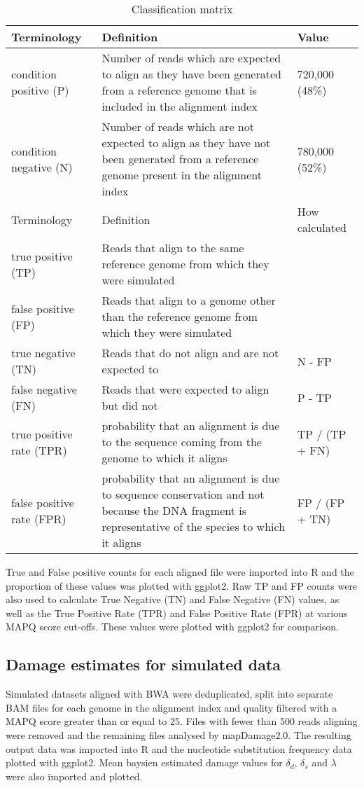 \documentclass[12pt, a4paper]{article}
\begin{document}
\begin{table}[!h]
\centering\small
\caption{Classification matrix}\label{Table:classificationMatrix}
\begin{tabular}{ C{2.5cm} L{9cm} C{3cm} }
	\toprule
	Terminology & Definition & Value \\
	\midrule
	condition positive (P) & Number of reads which are expected to align as they have been generated from a reference genome that is included in the alignment index & 720,000 (48\%) \\
	condition negative (N) & Number of reads which are not expected to align as they have not been generated from a reference genome present in the alignment index & 780,000 (52\%) \\
	\midrule
		Terminology & Definition & How calculated \\ 
	\midrule
	true positive (TP) & Reads that align to the same reference genome from which they were simulated & \\
	false positive (FP) & Reads that align to a genome other than the reference genome from which they were simulated & \\
	true negative (TN) & Reads that do not align and are not expected to & N - FP \\
	false negative (FN) & Reads that were expected to align but did not & P - TP \\
	true positive rate (TPR) & probability that an alignment is due to the sequence coming from the genome to which it aligns & TP / (TP + FN) \\
	false positive rate (FPR) & probability that an alignment is due to sequence conservation and not because the DNA fragment is representative of the species to which it aligns & FP / (FP + TN) \\
	\bottomrule
\end{tabular}
\end{table}


True and False positive counts for each aligned file were imported into R and the proportion of these values was plotted with ggplot2. Raw TP and FP counts were also used to calculate True Negative (TN) and False Negative (FN) values, as well as the True Positive Rate (TPR) and False Positive Rate (FPR) at various MAPQ score cut-offs. These values were plotted with ggplot2 for comparison.   

\subsection{Damage estimates for simulated data}
Simulated datasets aligned with BWA were deduplicated, split into separate BAM files for each genome in the alignment index and quality filtered with a MAPQ score greater than or equal to 25. Files with fewer than 500 reads aligning were removed and the remaining files analysed by mapDamage2.0. The resulting output data was imported into R and the nucleotide substitution frequency data plotted with ggplot2. Mean baysien estimated damage values for $\delta_d$, $\delta_s$ and $\lambda$ were also imported and plotted.
\end{document}
